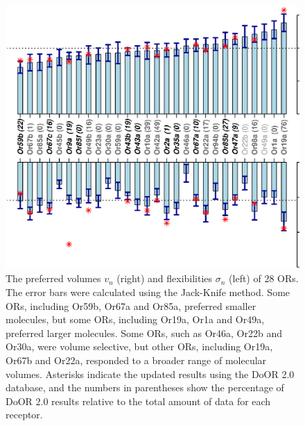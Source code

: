 \documentclass[fleqn,11pt]{wlscirep}
\newcommand{\numberofreceptors}{ 28 }
\begin{document}
\begin{figure}
		\centering
		\includegraphics[height=  0.75 \textwidth , angle=-90]{mean-std-vol-}
	\caption{The preferred volumes $v_n$ (right) 
		and flexibilities $\sigma_n$ (left) of \numberofreceptors ORs. 
		The error bars were calculated using the Jack-Knife method. 
		Some ORs, including Or59b, Or67a and Or85a, preferred smaller molecules, 
		but some ORs, including Or19a, Or1a and Or49a, preferred larger molecules.
		Some ORs, such as Or46a, Or22b and Or30a, were volume selective, 
		but other ORs, including Or19a, Or67b and Or22a, responded to a broader range of molecular volumes.
		Asterisks indicate the updated results using the DoOR 2.0 database, 
		and the numbers in  parentheses show the percentage of DoOR 2.0 results relative to the total amount of data for each receptor.
		}
		\label{fig:preferred_volume}
\end{figure}
\end{document}
